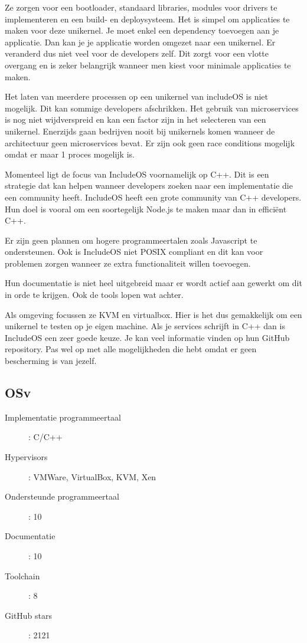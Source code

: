 \documentclass[pdftex,a4paper,12pt,twoside]{report}
\begin{document}
Ze zorgen voor een bootloader, standaard libraries, modules voor drivers te implementeren en een build- en deploysysteem. Het is simpel om applicaties te maken voor deze unikernel. Je moet enkel een dependency toevoegen aan je applicatie. Dan kan je je applicatie worden omgezet naar een unikernel. Er veranderd dus niet veel voor de developers zelf. Dit zorgt voor een vlotte overgang en is zeker belangrijk wanneer men kiest voor minimale applicaties te maken.

Het laten van meerdere processen op een unikernel van includeOS is niet mogelijk. Dit kan sommige developers afschrikken. Het gebruik van microservices is nog niet wijdverspreid en kan een factor zijn in het selecteren van een unikernel. Enerzijds gaan bedrijven nooit bij unikernels komen wanneer de architectuur geen microservices bevat. Er zijn ook geen race conditions mogelijk omdat er maar 1 proces mogelijk is.

Momenteel ligt de focus van IncludeOS voornamelijk op C++. Dit is een strategie dat kan helpen wanneer developers zoeken naar een implementatie die een community heeft. IncludeOS heeft een grote community van C++ developers. Hun doel is vooral om een soortegelijk Node.js te maken maar dan in efficiënt C++.

Er zijn geen plannen om hogere programmeertalen zoals Javascript te ondersteunen. Ook is IncludeOS niet POSIX compliant en dit kan voor problemen zorgen wanneer ze extra functionaliteit willen toevoegen.

Hun documentatie is niet heel uitgebreid maar er wordt actief aan gewerkt om dit in orde te krijgen. Ook de tools lopen wat achter.

Als omgeving focussen ze KVM en virtualbox. Hier is het dus gemakkelijk om een unikernel te testen op je eigen machine. Als je services schrijft in C++ dan is IncludeOS een zeer goede keuze. Je kan veel informatie vinden op hun GitHub repository. Pas wel op met alle mogelijkheden die hebt omdat er geen bescherming is van jezelf.

\subsection{OSv}

\begin{description}
  \item [Implementatie programmeertaal]: C/C++
  \item [Hypervisors]: VMWare, VirtualBox, KVM, Xen
  \item [Ondersteunde programmeertaal]: 10
  \item [Documentatie]: 10
  \item [Toolchain]: 8
  \item [GitHub stars]: 2121
\end{description}
\end{document}
